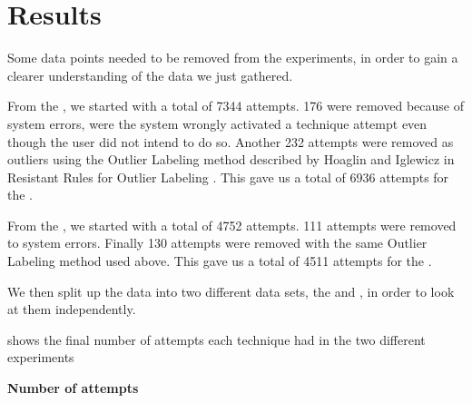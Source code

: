 \section{Results}\label{sec:results}

Some data points needed to be removed from the experiments, in order to gain a clearer understanding of the data we just gathered. 


From the \target, we started with a total of 7344 attempts.
176 were removed because of system errors, were the system wrongly activated a technique attempt even though the user did not intend to do so.
Another 232 attempts were removed as outliers using the Outlier Labeling method described by Hoaglin and Iglewicz in Resistant Rules for Outlier Labeling \cite{Hoaglin:1987}.
This gave us a total of 6936 attempts for the \target.

From the \accuracy, we started with a total of 4752 attempts.
111 attempts were removed to system errors. 
Finally 130 attempts were removed with the same Outlier Labeling method used above.
This gave us a total of 4511 attempts for the \accuracy.

We then split up the data into two different data sets, the \push and \pull, in order to look at them independently. 

 shows the final number of attempts each technique had in the two different experiments

\begin{table}[H]
	\centering
	\textbf{Number of attempts}\\[4pt]
	\begin{adjustbox}{width=\columnwidth}
	\end{adjustbox}
	\caption{Number of attempts for each technique in each experiment}
	\label{tab:numberOfAttempts}
\end{table}


